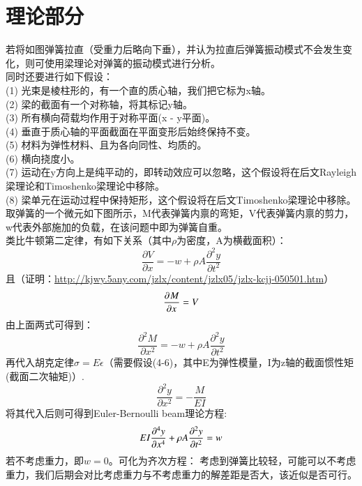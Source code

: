 \documentclass[UTF8,9pt]{report}
\begin{document}
\chapter{理论部分}
若将如图弹簧拉直（受重力后略向下垂），并认为拉直后弹簧振动模式不会发生变化，则可使用梁理论对弹簧的振动模式进行分析。\\
同时还要进行如下假设：\\
(1) 光束是棱柱形的，有一个直的质心轴，我们把它标为x轴。\\
(2) 梁的截面有一个对称轴，将其标记y轴。\\
(3) 所有横向荷载均作用于对称平面(x - y平面)。\\
(4) 垂直于质心轴的平面截面在平面变形后始终保持不变。\\
(5) 材料为弹性材料、且为各向同性、均质的。\\
(6) 横向挠度小。\\
(7) 运动在y方向上是纯平动的，即转动效应可以忽略，这个假设将在后文Rayleigh梁理论和Timoshenko梁理论中移除。\\
(8) 梁单元在运动过程中保持矩形，这个假设将在后文Timoshenko梁理论中移除。\\
取弹簧的一个微元如下图所示，M代表弹簧内禀的弯矩，V代表弹簧内禀的剪力，w代表外部施加的负载，在该问题中即为弹簧自重。\\
类比牛顿第二定律，有如下关系（其中$\rho$为密度，A为横截面积）：
\begin{equation}\frac { \partial V } { \partial x } = - w + \rho A \frac { \partial ^ { 2 } y } { \partial t ^ { 2 } } \label{5.1}
\end{equation}
且（证明：\url{http://kjwy.5any.com/jzlx/content/jzlx05/jzlx-kcjj-050501.htm}）
\begin{equation}
    \pp{M}{x}=V \label{5.2}
\end{equation}
由上面两式可得到：
$$\frac { \partial ^ { 2 } M } { \partial x ^ { 2 } } = - w + \rho A \frac { \partial ^ { 2 } y } { \partial t ^ { 2 } }$$
再代入胡克定律$\sigma=E\epsilon$（需要假设(4-6)，其中E为弹性模量，I为z轴的截面惯性矩(截面二次轴矩)）.
\begin{equation}
\frac { \partial ^ { 2 } y } { \partial x ^ { 2 } } =-\frac { M } { E I} \label{5.4}
\end{equation}
将其代入后则可得到Euler-Bernoulli beam理论方程:
\begin{equation}
    EI\pp[4]{y}{x}+\rho A\pp[2]{y}{t}=w \label{5.5}
\end{equation}
若不考虑重力，即$w=0$。可化为齐次方程：  {\color{red}考虑到弹簧比较轻，可能可以不考虑重力，我们后期会对比考虑重力与不考虑重力的解差距是否大，该近似是否可行。}
\end{document}
